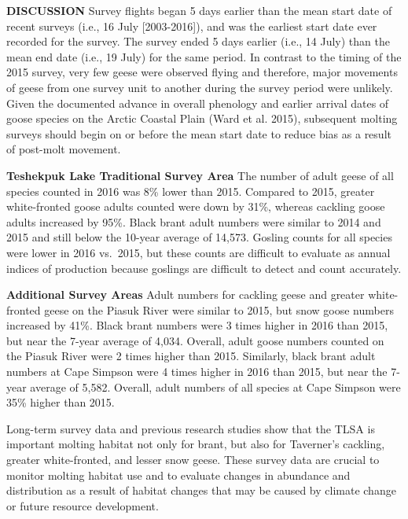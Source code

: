 \documentclass[]{article}
\begin{document}
\textbf{DISCUSSION}\break
Survey flights began 5 days earlier than the mean start date of recent
surveys (i.e., 16 July {[}2003-2016{]}), and was the earliest start date
ever recorded for the survey. The survey ended 5 days earlier (i.e., 14
July) than the mean end date (i.e., 19 July) for the same period. In
contrast to the timing of the 2015 survey, very few geese were observed
flying and therefore, major movements of geese from one survey unit to
another during the survey period were unlikely. Given the documented
advance in overall phenology and earlier arrival dates of goose species
on the Arctic Coastal Plain (Ward et al. 2015), subsequent molting
surveys should begin on or before the mean start date to reduce bias as
a result of post-molt movement.

\textbf{Teshekpuk Lake Traditional Survey Area}\newline
The number of adult geese of all species counted in 2016 was 8\% lower
than 2015. Compared to 2015, greater white-fronted goose adults counted
were down by 31\%, whereas cackling goose adults increased by 95\%.
Black brant adult numbers were similar to 2014 and 2015 and still below
the 10-year average of 14,573. Gosling counts for all species were lower
in 2016 vs.~2015, but these counts are difficult to evaluate as annual
indices of production because goslings are difficult to detect and count
accurately.

\textbf{Additional Survey Areas}\newline
Adult numbers for cackling geese and greater white-fronted geese on the
Piasuk River were similar to 2015, but snow goose numbers increased by
41\%. Black brant numbers were 3 times higher in 2016 than 2015, but
near the 7-year average of 4,034. Overall, adult goose numbers counted
on the Piasuk River were 2 times higher than 2015. Similarly, black
brant adult numbers at Cape Simpson were 4 times higher in 2016 than
2015, but near the 7-year average of 5,582. Overall, adult numbers of
all species at Cape Simpson were 35\% higher than 2015.

Long-term survey data and previous research studies show that the TLSA
is important molting habitat not only for brant, but also for Taverner's
cackling, greater white-fronted, and lesser snow geese. These survey
data are crucial to monitor molting habitat use and to evaluate changes
in abundance and distribution as a result of habitat changes that may be
caused by climate change or future resource development.
\end{document}

